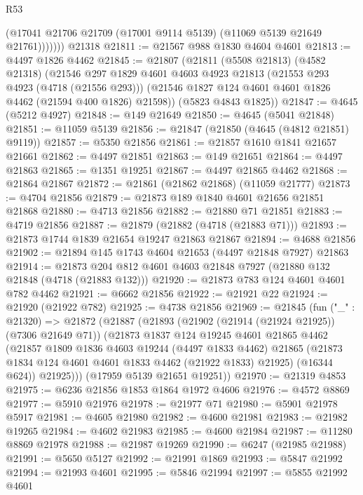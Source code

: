 \begin{lexlean}{R53}
\begin{coremodule}
              (@17041 @21706 @21709 (@17001 @9114 @5139) (@11069 @5139 @21649 @21761)))))))
    @21318
@21811 := @21567 @988 @1830 @4604 @4601
@21813 := @4497 @1826 @4462
@21845 := @21807
    (@21811
      (@5508 @21813)
      (@4582 @21318)
      (@21546
        @297
        @1829
        @4601
        @4603
        @4923
        @21813
        (@21553 @293 @4923 (@4718 (@21556 @293)))
        (@21546 @1827 @124 @4601 @4601 @1826 @4462 (@21594 @400 @1826) @21598))
      (@5823 @4843 @1825))
@21847 := @4645 (@5212 @4927)
@21848 := @149 @21649
@21850 := @4645 (@5041 @21848)
@21851 := @11059 @5139
@21856 := @21847 (@21850 (@4645 (@4812 @21851) @9119))
@21857 := @5350 @21856
@21861 := @21857 @1610 @1841 @21657 @21661
@21862 := @4497 @21851
@21863 := @149 @21651
@21864 := @4497 @21863
@21865 := @1351 @19251
@21867 := @4497 @21865 @4462
@21868 := @21864 @21867
@21872 := @21861 (@21862 @21868) (@11059 @21777)
@21873 := @4704 @21856
@21879 := @21873 @189 @1840 @4601 @21656 @21851 @21868
@21880 := @4713 @21856
@21882 := @21880 @71 @21851
@21883 := @4719 @21856
@21887 := @21879 (@21882 (@4718 (@21883 @71)))
@21893 := @21873 @1744 @1839 @21654 @19247 @21863 @21867
@21894 := @4688 @21856
@21902 := @21894 @145 @1743 @4604 @21653 (@4497 @21848 @7927) @21863
@21914 := @21873 @204 @812 @4601 @4603 @21848 @7927 (@21880 @132 @21848 (@4718 (@21883 @132)))
@21920 := @21873 @783 @124 @4601 @4601 @782 @4462
@21921 := @6662 @21856
@21922 := @21921 @22
@21924 := @21920 (@21922 @782)
@21925 := @4738 @21856
@21969 := @21845
    (fun ("_" : @21320) =>
    @21872
      (@21887
        (@21893
          (@21902 (@21914 (@21924 @21925)) (@7306 @21649 @71))
          (@21873
            @1837
            @124
            @19245
            @4601
            @21865
            @4462
            (@21857
              @1809
              @1836
              @4603
              @19244
              (@4497 @1833 @4462)
              @21865
              (@21873 @1834 @124 @4601 @4601 @1833 @4462 (@21922 @1833) @21925)
              (@16344 @624))
            @21925)))
      (@17959 @5139 @21651 @19251))
@21970 := @21319 @4853
@21975 := @6236 @21856 @1853 @1864 @1972 @4606
@21976 := @4572 @8869
@21977 := @5910 @21976
@21978 := @21977 @71
@21980 := @5901 @21978 @5917
@21981 := @4605 @21980
@21982 := @4600 @21981
@21983 := @21982 @19265
@21984 := @4602 @21983
@21985 := @4600 @21984
@21987 := @11280 @8869 @21978
@21988 := @21987 @19269
@21990 := @6247 (@21985 @21988)
@21991 := @5650 @5127
@21992 := @21991 @1869
@21993 := @5847 @21992
@21994 := @21993 @4601
@21995 := @5846 @21994
@21997 := @5855 @21992 @4601

\end{coremodule}
\end{lexlean}
